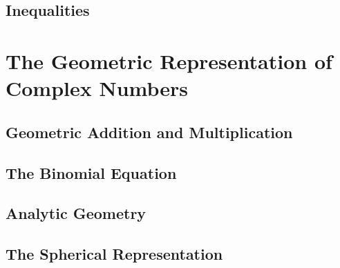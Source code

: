 \subsection{Inequalities}
\section{The Geometric Representation of Complex Numbers}
\subsection{Geometric Addition and Multiplication}
\subsection{The Binomial Equation}
\subsection{Analytic Geometry}
\subsection{The Spherical Representation}
